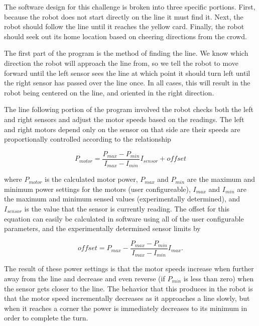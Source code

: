 \documentclass[journal]{IEEEtran}
\begin{document}
The software design for this challenge is broken into three specific portions. First, because the robot does not start directly on the line it must find it. Next, the robot should follow the line until it reaches the yellow card. Finally, the robot should seek out its home location based on cheering directions from the crowd.

The first part of the program is the method of finding the line. We know which direction the robot will approach the line from, so we tell the robot to move forward until the left sensor sees the line at which point it should turn left until the right sensor has passed over the line once. In all cases, this will result in the robot being centered on the line, and oriented in the right direction. 

The line following portion of the program involved the robot checks both the left and right sensors and adjust the motor speeds based on the readings. The left and right motors depend only on the sensor on that side are their speeds are proportionally controlled according to the relationship 

\begin{equation}\label{E.motor_speed}
    P_{motor} = \frac{P_{max}-P_{min}}{I_{max}-I_{min}}I_{sensor} + offset
\end{equation}

where $P_{motor}$ is the calculated motor power, $P_{max}$ and $P_{min}$ are the maximum and minimum power settings for the motors (user configureable), $I_{max}$ and $I_{min}$ are the maximum and minimum sensed values (experimentally determined), and $I_{sensor}$ is the value that the sensor is currently reading. The offset for this equation can easily be calculated in software using all of the user configurable parameters, and the experimentally determined sensor limits by

\begin{equation}\label{E.motor_speed}
    offset = P_{max} - \frac{P_{max}-P_{min}}{I_{max}-I_{min}}I_{max}.
\end{equation}

The result of these power settings is that the motor speeds increase when further away from the line and decrease and even reverse (if $P_{min}$ is less than zero) when the sensor gets closer to the line. The behavior that this produces in the robot is that the motor speed incrementally decreases as it approaches a line slowly, but when it reaches a corner the power is immediately decreases to its minimum in order to complete the turn. 
\end{document}
